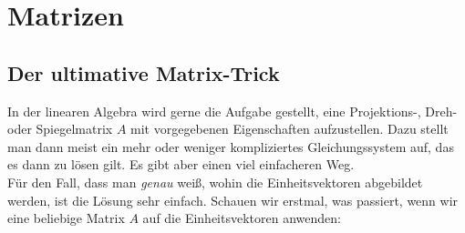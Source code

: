 \section{Matrizen}
\subsection{Der ultimative Matrix-Trick}
In der linearen Algebra wird gerne die Aufgabe gestellt, eine Projektions-, Dreh- oder Spiegelmatrix $A$ mit vorgegebenen Eigenschaften aufzustellen. Dazu stellt man dann meist ein mehr oder weniger kompliziertes Gleichungssystem auf, das es dann zu lösen gilt. Es gibt aber einen viel einfacheren Weg.\\
Für den Fall, dass man \textit{genau} weiß, wohin die Einheitsvektoren abgebildet werden, ist die Lösung sehr einfach. Schauen wir erstmal, was passiert, wenn wir eine beliebige Matrix $A$ auf die Einheitsvektoren anwenden:


